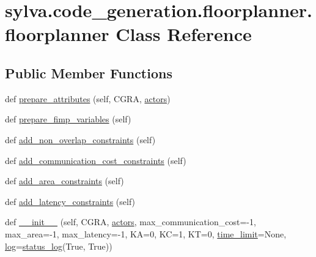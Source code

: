 \hypertarget{classsylva_1_1code__generation_1_1floorplanner_1_1floorplanner}{}\section{sylva.\+code\+\_\+generation.\+floorplanner.\+floorplanner Class Reference}
\label{classsylva_1_1code__generation_1_1floorplanner_1_1floorplanner}
\subsection*{Public Member Functions}
\begin{DoxyCompactItemize}
\item 
def \hyperlink{classsylva_1_1code__generation_1_1floorplanner_1_1floorplanner_ab5bba2d11374f0e3fe5199738e01033a}{prepare\+\_\+attributes} (self, C\+G\+RA, \hyperlink{classsylva_1_1code__generation_1_1floorplanner_1_1floorplanner_aeb0a7c06073d6f238ca448fd31a08e75}{actors})
\item 
def \hyperlink{classsylva_1_1code__generation_1_1floorplanner_1_1floorplanner_a387bfe2b35c791b09f18bf891f94d101}{prepare\+\_\+fimp\+\_\+variables} (self)
\item 
def \hyperlink{classsylva_1_1code__generation_1_1floorplanner_1_1floorplanner_a5e9f74cf3d397e97186ce25d8304fbe0}{add\+\_\+non\+\_\+overlap\+\_\+constraints} (self)
\item 
def \hyperlink{classsylva_1_1code__generation_1_1floorplanner_1_1floorplanner_a8fa40b80a9a8bed617cb297758c0c5b5}{add\+\_\+communication\+\_\+cost\+\_\+constraints} (self)
\item 
def \hyperlink{classsylva_1_1code__generation_1_1floorplanner_1_1floorplanner_a0be73170e12b6ac4ecb594d4dab14f0d}{add\+\_\+area\+\_\+constraints} (self)
\item 
def \hyperlink{classsylva_1_1code__generation_1_1floorplanner_1_1floorplanner_a4ef5c93298c0f40db47c15ed7c9c6f02}{add\+\_\+latency\+\_\+constraints} (self)
\item 
def \hyperlink{classsylva_1_1code__generation_1_1floorplanner_1_1floorplanner_abd8cead4c94d6202ff252a9e37615abe}{\+\_\+\+\_\+init\+\_\+\+\_\+} (self, C\+G\+RA, \hyperlink{classsylva_1_1code__generation_1_1floorplanner_1_1floorplanner_aeb0a7c06073d6f238ca448fd31a08e75}{actors}, max\+\_\+communication\+\_\+cost=-\/1, max\+\_\+area=-\/1, max\+\_\+latency=-\/1, KA=0, KC=1, KT=0, \hyperlink{classsylva_1_1code__generation_1_1floorplanner_1_1floorplanner_aa6a27c1e810c6242a6876d943e108460}{time\+\_\+limit}=None, \hyperlink{classsylva_1_1code__generation_1_1floorplanner_1_1floorplanner_a931da93a5d8a1efd65e401913fb722db}{log}=\hyperlink{classsylva_1_1misc_1_1util_1_1status__log}{status\+\_\+log}(True, True))

\end{DoxyCompactItemize}
